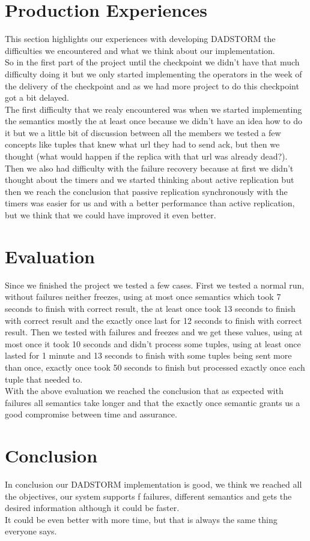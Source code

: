\documentclass[times, 10pt, twocolumn]{article}
\begin{document}
\section{Production Experiences}
This section highlights our experiences with developing DADSTORM the difficulties we encountered and what we think about our implementation.
\\So in the first part of the project until the checkpoint we didn't have that much difficulty doing it but we only started implementing the operators in the week of the delivery of the checkpoint and as we had more project to do this checkpoint got a bit delayed.
\\The first difficulty that we realy encountered was when we started implementing the semantics mostly the at least once because we didn't have an idea how to do it but we a little bit of discussion between all the members we tested a few concepts like tuples that knew what url they had to send ack, but then we thought (what would happen if the replica with that url was already dead?).
\\Then we also had difficulty with the failure recovery because at first we didn't thought about the timers and we started thinking about active replication but then we reach the conclusion that passive replication synchronously with the timers was easier for us and with a better performance than active replication, but we think that we could have improved it even better. 




\section{Evaluation}
Since we finished the project we tested a few cases. First we tested a normal run, without failures neither freezes, using at most once semantics which took 7 seconds to finish with correct result, the at least once took 13 seconds to finish with correct result and the exactly once last for 12 seconds to finish with correct result. Then we tested with failures and freezes and we get these values, using at most once it took 10 seconds and didn't process some tuples, using at least once lasted for 1 minute and 13 seconds to finish with some tuples being sent more than once, exactly once took 50 seconds to finish but processed exactly once each tuple that needed to.
\\With the above evaluation we reached the conclusion that as expected with failures all semantics take longer and that the exactly once semantic grants us a good compromise between time and assurance.





\section{Conclusion}
In conclusion our DADSTORM implementation is good, we think we reached all the objectives, our system supports f failures, different semantics and gets the desired information although it could be faster.
\\It could be even better with more time, but that is always the same thing everyone says.
\end{document}
